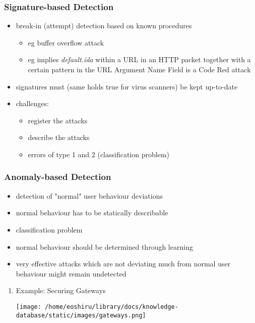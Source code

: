 \documentclass[11pt]{article}
\begin{document}
\subsubsection{Signature-based Detection}
\label{sec:org1443489}
\begin{itemize}
\item break-in (attempt) detection based on known procedures
\begin{itemize}
\item eg buffer overflow attack
\item eg implies \emph{default.ida} within a URL in an HTTP packet together with a certain pattern in the URL Argument Name Field is a Code Red attack
\end{itemize}
\item signatures must (same holds true for virus scanners) be kept up-to-date
\item challenges:
\begin{itemize}
\item register the attacks
\item describe the attacks
\item errors of type 1 and 2 (classification problem)
\end{itemize}
\end{itemize}

\subsubsection{Anomaly-based Detection}
\label{sec:org3bffd78}
\begin{itemize}
\item detection of "normal" user behaviour deviations
\item normal behaviour has to be statically describable
\item classification problem
\item normal behaviour should be determined through learning
\item very effective attacks which are not deviating much from normal user behaviour might remain undetected
\end{itemize}

\begin{enumerate}
\item Example: Securing Gateways
\label{sec:orgb3340b6}
\begin{center}
\texttt{[image: /home/eoshiru/library/docs/knowledge-database/static/images/gateways.png]}
\end{center}
\end{enumerate}
\end{document}
